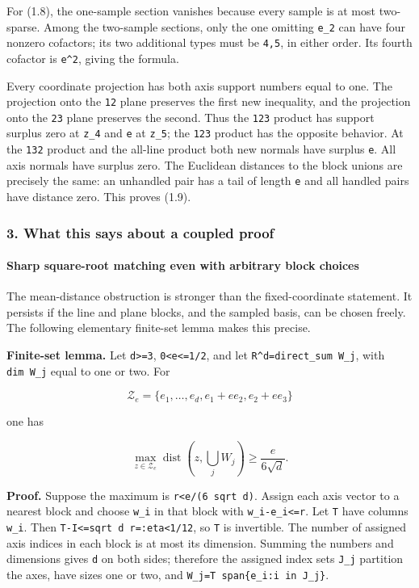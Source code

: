 \documentclass[
  11pt,
]{article}
\begin{document}
For (1.8), the one-sample section vanishes because every sample is at
most two-sparse. Among the two-sample sections, only the one omitting
\texttt{e\_2} can have four nonzero cofactors; its two additional types
must be \texttt{4,5}, in either order. Its fourth cofactor is
\texttt{e\^{}2}, giving the formula.

Every coordinate projection has both axis support numbers equal to one.
The projection onto the \texttt{12} plane preserves the first new
inequality, and the projection onto the \texttt{23} plane preserves the
second. Thus the \texttt{12\textbar{}3} product has support surplus zero
at \texttt{z\_4} and \texttt{e} at \texttt{z\_5}; the
\texttt{1\textbar{}23} product has the opposite behavior. At the
\texttt{13\textbar{}2} product and the all-line product both new normals
have surplus \texttt{e}. All axis normals have surplus zero. The
Euclidean distances to the block unions are precisely the same: an
unhandled pair has a tail of length \texttt{e} and all handled pairs
have distance zero. This proves (1.9).

\subsubsection{3. What this says about a coupled
proof}\label{what-this-says-about-a-coupled-proof}

\paragraph{Sharp square-root matching even with arbitrary block
choices}\label{sharp-square-root-matching-even-with-arbitrary-block-choices}

The mean-distance obstruction is stronger than the fixed-coordinate
statement. It persists if the line and plane blocks, and the sampled
basis, can be chosen freely. The following elementary finite-set lemma
makes this precise.

\textbf{Finite-set lemma.} Let \texttt{d\textgreater{}=3},
\texttt{0\textless{}e\textless{}=1/2}, and let
\texttt{R\^{}d=direct\_sum\ W\_j}, with \texttt{dim\ W\_j} equal to one
or two. For

\[
 \mathcal Z_e=\{e_1,\ldots,e_d,e_1+e e_2,e_2+e e_3\}
\]

one has

\[
 \max_{z\in\mathcal Z_e}\operatorname{dist}(z,\bigcup_jW_j)
       \ge\frac{e}{6\sqrt d}. \tag{3.2}
\]

\textbf{Proof.} Suppose the maximum is
\texttt{r\textless{}e/(6\ sqrt\ d)}. Assign each axis vector to a
nearest block and choose \texttt{w\_i} in that block with
\texttt{\textbar{}w\_i-e\_i\textbar{}\textless{}=r}. Let \texttt{T} have
columns \texttt{w\_i}. Then
\texttt{\textbar{}\textbar{}T-I\textbar{}\textbar{}\textless{}=sqrt\ d\ r=:eta\textless{}1/12},
so \texttt{T} is invertible. The number of assigned axis indices in each
block is at most its dimension. Summing the numbers and dimensions gives
\texttt{d} on both sides; therefore the assigned index sets
\texttt{J\_j} partition the axes, have sizes one or two, and
\texttt{W\_j=T\ span\{e\_i:i\ in\ J\_j\}}.
\end{document}
